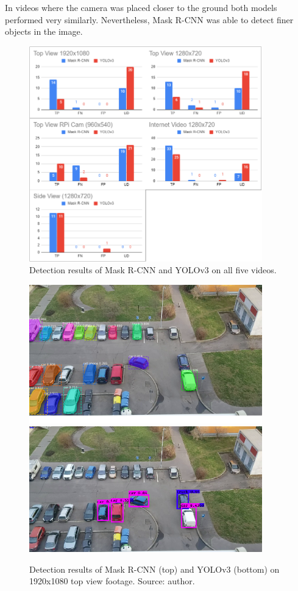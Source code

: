 \documentclass[thesis=M,english]{FITthesis}[2019/03/06]
\begin{document}
In videos where the camera was placed closer to the ground both models performed very similarly. Nevertheless, Mask R-CNN was able to detect finer objects in the image.

\begin{figure}[!htb]
	\centering
	\includegraphics[width=0.90\textwidth]{imgs/graphs.png}
	\caption{Detection results of Mask R-CNN and YOLOv3 on all five videos.}
	\label{label:comparison_graph}
\end{figure}
\begin{figure}[!htb]
	\centering
	\includegraphics[width=0.90\textwidth]{imgs/mask-fhd.png}
	\includegraphics[width=0.90\textwidth]{imgs/yolo-fhd.png}
	\caption{Detection results of Mask R-CNN (top) and YOLOv3 (bottom) on 1920x1080 top view footage. Source: author.}
	\label{label:comparison_fhd}
\end{figure}
\end{document}
